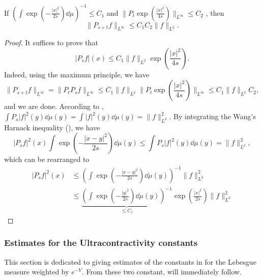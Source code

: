 \begin{theorem} \label{thm:ultracon}
    If \( (\int \exp\left(-\frac{|x|^2}{2s}\right) \dd{\mu})^{-1} \le C_1 \) and \( \|P_{t} \exp\left(\frac{|x|^2}{4s}\right)\|_{L^{\infty}} \le C_2 \) , then
    \[
        \|P_{s+t} f\|_{L^{\infty}} \le C_1 C_2 \|f\|_{L^2}.
    \]
\end{theorem}
\begin{proof}
    It suffices to prove that
    \begin{equation}
        |P_{s} f|(x) \le C_1 \| f \|_{L^2} \exp\left(\frac{|x|^2}{4s}\right) .
    \end{equation}
    Indeed, using the maximum principle, we have
    \begin{equation*}
        \|P_{s+t} f\|_{L^{\infty}} 
        = \|P_{t} P_{s} f\|_{L^{\infty}} 
        \le C_1 \|f\|_{L^2} \|P_{t} \exp\left(\frac{|x|^2}{4s}\right)\|_{L^{\infty}} 
        \le C_1 \|f\|_{L^2} C_2,
    \end{equation*}
    and we are done.
    According to , \( \int P_{s} |f|^2(y) \dd{\mu(y)} = \int |f|^2(y) \dd{\mu(y)} = \| f \|_{L^2}^2 \).
    By integrating the Wang's Harnack inequality (), we have
    \begin{equation}
        |P_{s} f|^2(x) \int \exp\left(-\frac{|x-y|^2}{2s}\right) \dd{\mu(y)}
        \le \int P_{s} |f|^2(y) \dd{\mu(y)}
        = \| f \|_{L^2}^2,
    \end{equation}
    which can be rearranged to
    \begin{align*}
        |P_{s} f|^2(x) 
        &\le \left( \int \exp\left(-\frac{|x-y|^2}{2s}\right) \dd{\mu(y)} \right)^{-1} \| f \|_{L^2}^2 \\
        &\le \underbrace{\left( \int \exp\left(-\frac{|y|^2}{2s}\right) \dd{\mu(y)} \right)^{-1}}_{\le C_1} \exp\left(\frac{|x|^2}{2s}\right) \| f \|_{L^2}^2
    \end{align*}
\end{proof}

\subsubsection*{Estimates for the Ultracontractivity constants}

This section is dedicated to giving estimates of the constants in  for the Lebesgue measure weighted by $e^{-V}$. From these two constant,  will immediately follow.

